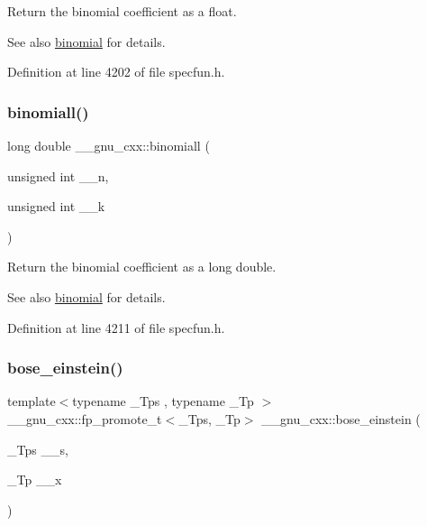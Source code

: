 Return the binomial coefficient as a {\ttfamily float}.

\begin{DoxySeeAlso}{See also}
\hyperlink{group__gnu__math__spec__func_gabd0cf6e3f1e1d36c4c45f118e34a5ca2}{binomial} for details. 
\end{DoxySeeAlso}


Definition at line 4202 of file specfun.\+h.

\mbox{\label{group__gnu__math__spec__func_ga57602195f9215f735793c11d3210ac93}} 
\subsubsection{\texorpdfstring{binomiall()}{binomiall()}}
{\footnotesize\ttfamily long double \+\_\+\+\_\+gnu\+\_\+cxx\+::binomiall (\begin{DoxyParamCaption}\item[{unsigned int}]{\+\_\+\+\_\+n,  }\item[{unsigned int}]{\+\_\+\+\_\+k }\end{DoxyParamCaption})\hspace{0.3cm}{\ttfamily [inline]}}

Return the binomial coefficient as a {\ttfamily long double}.

\begin{DoxySeeAlso}{See also}
\hyperlink{group__gnu__math__spec__func_gabd0cf6e3f1e1d36c4c45f118e34a5ca2}{binomial} for details. 
\end{DoxySeeAlso}


Definition at line 4211 of file specfun.\+h.

\mbox{\label{group__gnu__math__spec__func_gae8135b6861a48f2cee2e692093a17102}} 
\subsubsection{\texorpdfstring{bose\+\_\+einstein()}{bose\_einstein()}}
{\footnotesize\ttfamily template$<$typename \+\_\+\+Tps , typename \+\_\+\+Tp $>$ \\
\+\_\+\+\_\+gnu\+\_\+cxx\+::fp\+\_\+promote\+\_\+t$<$\+\_\+\+Tps, \+\_\+\+Tp$>$ \+\_\+\+\_\+gnu\+\_\+cxx\+::bose\+\_\+einstein (\begin{DoxyParamCaption}\item[{\+\_\+\+Tps}]{\+\_\+\+\_\+s,  }\item[{\+\_\+\+Tp}]{\+\_\+\+\_\+x }\end{DoxyParamCaption})\hspace{0.3cm}{\ttfamily [inline]}}

